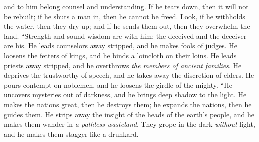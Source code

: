 \begin{biblechapter}
and to him belong counsel and understanding.
\verse If he tears down, then it will not be rebuilt; 
if he shuts a man in, then he cannot be freed.
\verse Look, if he withholds the water, then they dry up; 
and if he sends them out, then they overwhelm the land.
\verse “Strength and sound wisdom are with him; 
the deceived and the deceiver are his.
\verse He leads counselors away stripped, 
and he makes fools of judges.
\verse He loosens the fetters of kings, 
and he binds a loincloth on their loins.
\verse He leads priests away stripped, 
and he overthrows \textit{the members of ancient families}.
\verse He deprives the trustworthy of speech, 
and he takes away the discretion of elders.
\verse He pours contempt on noblemen, 
and he loosens the girdle of the mighty.
\verse “He uncovers mysteries out of darkness, 
and he brings deep shadow to the light.
\verse He makes the nations great, then he destroys them; 
he expands the nations, then he guides them.
\verse He strips away the insight of the heads of the earth’s people, 
and he makes them wander in \textit{a pathless wasteland}.
\verse They grope in the dark \textit{without} light, 
and he makes them stagger like a drunkard.
\end{biblechapter}

